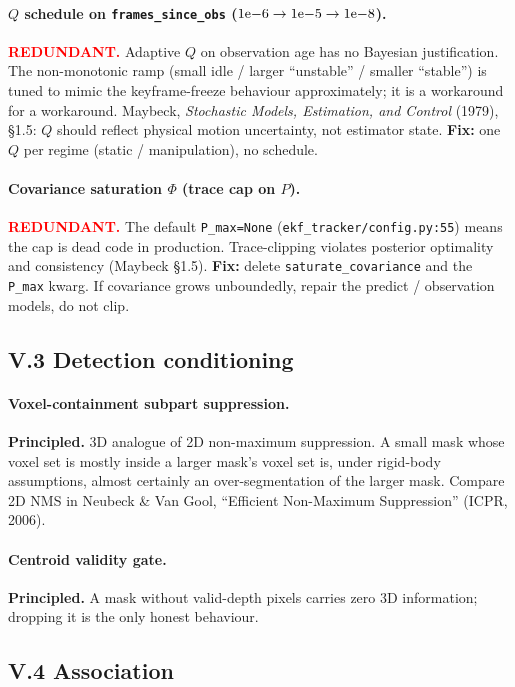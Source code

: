 \documentclass[11pt]{article}
\newcommand{\REDUNDANT}{\textcolor{red}{\textbf{REDUNDANT.}}}
\newcommand{\PRINCIPLED}{\textbf{Principled.}}
\begin{document}
\paragraph{$Q$ schedule on \texttt{frames\_since\_obs} ($1{\rm e}{-}6\to1{\rm e}{-}5\to1{\rm e}{-}8$).}
\REDUNDANT{} Adaptive $Q$ on observation age has no Bayesian
justification. The non-monotonic ramp (small idle / larger ``unstable''
/ smaller ``stable'') is tuned to mimic the keyframe-freeze behaviour
approximately; it is a workaround for a workaround. Maybeck,
\emph{Stochastic Models, Estimation, and Control} (1979), \S 1.5: $Q$
should reflect physical motion uncertainty, not estimator state.
\textbf{Fix:} one $Q$ per regime (static / manipulation), no schedule.

\paragraph{Covariance saturation $\Phi$ (trace cap on $P$).}
\REDUNDANT{} The default \texttt{P\_max=None}
(\texttt{ekf\_tracker/config.py:55}) means the cap is dead code in
production. Trace-clipping violates posterior optimality and
consistency (Maybeck \S 1.5).
\textbf{Fix:} delete \texttt{saturate\_covariance} and the
\texttt{P\_max} kwarg. If covariance grows unboundedly, repair the
predict / observation models, do not clip.

\subsection*{V.3 Detection conditioning}

\paragraph{Voxel-containment subpart suppression.}
\PRINCIPLED{} 3D analogue of 2D non-maximum suppression. A small
mask whose voxel set is mostly inside a larger mask's voxel set is,
under rigid-body assumptions, almost certainly an over-segmentation of
the larger mask. Compare 2D NMS in Neubeck \& Van Gool, ``Efficient
Non-Maximum Suppression'' (ICPR, 2006).

\paragraph{Centroid validity gate.}
\PRINCIPLED{} A mask without valid-depth pixels carries zero 3D
information; dropping it is the only honest behaviour.

\subsection*{V.4 Association}
\end{document}
